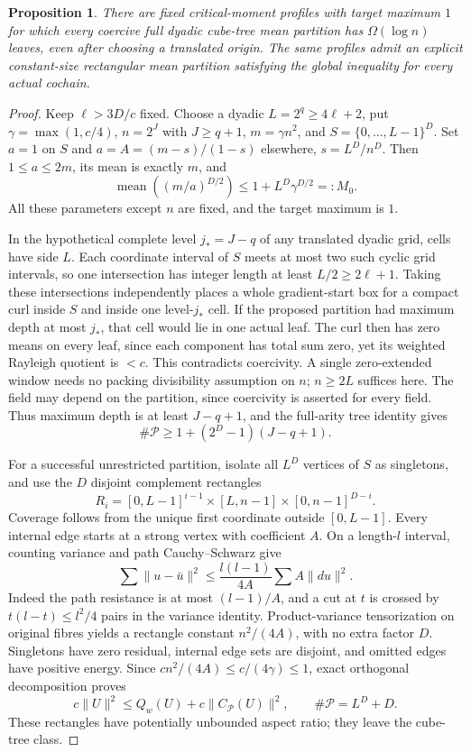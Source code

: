 \documentclass[11pt]{article}
\newtheorem{proposition}{Proposition}
\begin{document}
\begin{proposition}\label{prop:dyadic}
There are fixed critical-moment profiles with target maximum $1$ for which every
coercive full dyadic cube-tree mean partition has $\Omega(\log n)$ leaves, even after
choosing a translated origin. The same profiles admit an explicit constant-size
rectangular mean partition satisfying the global inequality for every actual cochain.
\end{proposition}
\begin{proof}
Keep $\ell>3D/c$ fixed. Choose a dyadic $L=2^q\geq4\ell+2$, put
$\gamma=\max(1,c/4)$, $n=2^J$ with $J\geq q+1$, $m=\gamma n^2$, and
$S=\{0,\ldots,L-1\}^D$. Set $a=1$ on $S$ and $a=A=(m-s)/(1-s)$ elsewhere,
$s=L^D/n^D$. Then $1\leq a\leq2m$, its mean is exactly $m$, and
\[
 \operatorname{mean}((m/a)^{D/2})\leq1+L^D\gamma^{D/2}=:M_0.
\]
All these parameters except $n$ are fixed, and the target maximum is $1$.

In the hypothetical complete level $j_*=J-q$ of any translated dyadic grid, cells
have side $L$. Each coordinate interval of $S$ meets at most two such cyclic grid
intervals, so one intersection has integer length at least $L/2\geq2\ell+1$.
Taking these intersections independently places a whole gradient-start box for a
compact curl inside $S$ and inside one level-$j_*$ cell. If the proposed partition
had maximum depth at most $j_*$, that cell would lie in one actual leaf. The curl
then has zero means on every leaf, since each component has total sum zero, yet its
weighted Rayleigh quotient is $<c$. This contradicts coercivity. A single zero-extended
window needs no packing divisibility assumption on $n$; $n\geq2L$ suffices here.
The field may depend on the partition, since coercivity is asserted for every field.
Thus maximum depth is at least $J-q+1$, and the full-arity tree identity gives
\begin{equation}\label{eq:dyadiclower}
 \#\mathcal P\geq1+(2^D-1)(J-q+1).
\end{equation}

For a successful unrestricted partition, isolate all $L^D$ vertices of $S$ as
singletons, and use the $D$ disjoint complement rectangles
\[
 R_i=[0,L-1]^{i-1}\times[L,n-1]\times[0,n-1]^{D-i}.
\]
Coverage follows from the unique first coordinate outside $[0,L-1]$.
Every internal edge starts at a strong vertex with coefficient $A$.
On a length-$l$ interval, counting variance and path Cauchy--Schwarz give
\[
 \sum\|u-\bar u\|^2\leq\frac{l(l-1)}{4A}\sum A\|du\|^2.
\]
Indeed the path resistance is at most $(l-1)/A$, and a cut at $t$ is crossed by
$t(l-t)\leq l^2/4$ pairs in the variance identity.
Product-variance tensorization on original fibres yields a rectangle constant
$n^2/(4A)$, with no extra factor $D$. Singletons have zero residual, internal edge
sets are disjoint, and omitted edges have positive energy. Since
$cn^2/(4A)\leq c/(4\gamma)\leq1$, exact orthogonal decomposition proves
\[
 c\|U\|^2\leq Q_w(U)+c\|C_{\mathcal P}(U)\|^2,
 \qquad \#\mathcal P=L^D+D.
\]
These rectangles have potentially unbounded aspect ratio; they leave the cube-tree class.
\end{proof}
\end{document}
